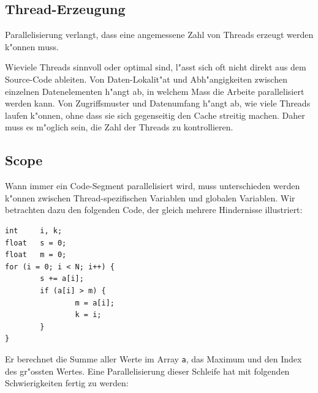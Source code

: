 \subsection{Thread-Erzeugung}
Parallelisierung verlangt, dass eine angemessene Zahl von Threads erzeugt
werden k"onnen muss.

Wieviele Threads sinnvoll oder optimal sind, l"asst sich oft nicht
direkt aus dem Source-Code ableiten.
Von
Daten-Lokalit"at und Abh"angigkeiten zwischen einzelnen Datenelementen
h"angt ab, in welchem Mass die Arbeite parallelisiert werden kann.
Von Zugriffsmuster und Datenumfang h"angt ab, wie viele Threads
laufen k"onnen, ohne dass sie sich gegenseitig den Cache streitig machen.
Daher muss es m"oglich sein, die Zahl der Threads zu kontrollieren.

\subsection{Scope}
Wann immer ein Code-Segment parallelisiert wird, muss unterschieden
werden k"onnen zwischen Thread-spezifischen Variablen und globalen
Variablen.
Wir betrachten dazu den folgenden Code, der gleich mehrere Hindernisse
illustriert:
\begin{verbatim}
int     i, k;
float   s = 0;
float   m = 0;
for (i = 0; i < N; i++) {
        s += a[i];
        if (a[i] > m) {
                m = a[i];
                k = i;
        }
}
\end{verbatim}
Er berechnet die Summe aller Werte im Array {\tt a}, das Maximum und den
Index des gr"ossten Wertes.
Eine Parallelisierung dieser Schleife hat mit folgenden Schwierigkeiten
fertig zu werden:
